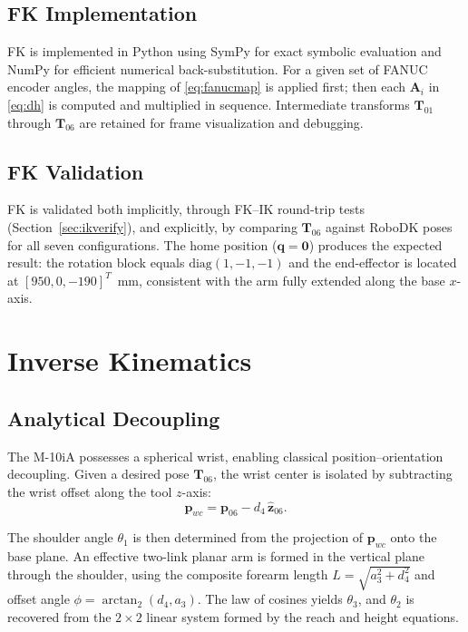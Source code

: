 \documentclass[conference]{IEEEtran}
\begin{document}
\subsection{FK Implementation}
FK is implemented in Python using SymPy for exact symbolic evaluation and NumPy for efficient numerical back-substitution.
For a given set of FANUC encoder angles, the mapping of \eqref{eq:fanucmap} is applied first; then each $\mathbf{A}_i$ in \eqref{eq:dh} is computed and multiplied in sequence.
Intermediate transforms $\mathbf{T}_{01}$ through $\mathbf{T}_{06}$ are retained for frame visualization and debugging.

\subsection{FK Validation}
FK is validated both implicitly, through FK--IK round-trip tests (Section~\ref{sec:ikverify}), and explicitly, by comparing $\mathbf{T}_{06}$ against RoboDK poses for all seven configurations.
The home position ($\mathbf{q}=\mathbf{0}$) produces the expected result: the rotation block equals $\mathrm{diag}(1,-1,-1)$ and the end-effector is located at $[950, 0, -190]^T$~mm, consistent with the arm fully extended along the base $x$-axis.

\section{Inverse Kinematics}

\subsection{Analytical Decoupling}
The M-10iA possesses a spherical wrist, enabling classical position--orientation decoupling.
Given a desired pose $\mathbf{T}_{06}$, the wrist center is isolated by subtracting the wrist offset along the tool $z$-axis:
\begin{equation}
\mathbf{p}_{wc} = \mathbf{p}_{06} - d_4\,\hat{\mathbf{z}}_{06}.
\end{equation}

The shoulder angle $\theta_1$ is then determined from the projection of $\mathbf{p}_{wc}$ onto the base plane.
An effective two-link planar arm is formed in the vertical plane through the shoulder, using the composite forearm length $L = \sqrt{a_3^2 + d_4^2}$ and offset angle $\phi = \arctan_2(d_4, a_3)$.
The law of cosines yields $\theta_3$, and $\theta_2$ is recovered from the $2{\times}2$ linear system formed by the reach and height equations.
\end{document}
